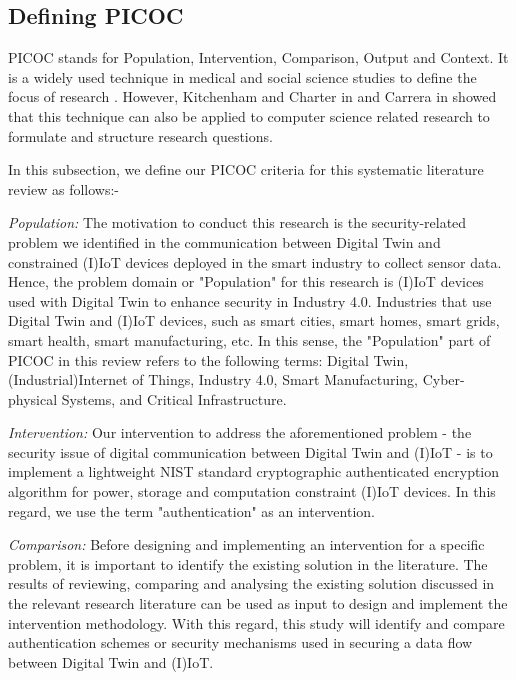 
\subsection{Defining PICOC}
PICOC stands for Population, Intervention, Comparison, Output and Context. It is a widely used technique in medical and social science studies to define the focus of research \cite{carrera-rivera_how-conduct_2022}. However, Kitchenham and Charter in \cite{carrera-rivera_how-conduct_2022} and Carrera in \cite{kitchenham_guidelines_2007} showed that this technique can also be applied to computer science related research to formulate and structure research questions. 

In this subsection, we define our PICOC criteria for this systematic literature review as follows:-

\textit{Population:} The motivation to conduct this research is the security-related problem we identified in the communication between Digital Twin and constrained  (I)IoT devices deployed in the smart industry to collect sensor data. Hence, the problem domain or "Population" for this research is (I)IoT devices used with Digital Twin to enhance security in Industry 4.0. Industries that use Digital Twin and (I)IoT devices, such as smart cities, smart homes, smart grids, smart health, smart manufacturing, etc. In this sense, the "Population" part of PICOC in this review refers to the following terms: Digital Twin, (Industrial)Internet of Things, Industry 4.0, Smart Manufacturing, Cyber-physical Systems, and Critical Infrastructure. 

\textit{Intervention:} Our intervention to address the aforementioned problem - the security issue of digital communication between Digital Twin and (I)IoT - is to implement a lightweight NIST standard cryptographic authenticated encryption algorithm for power, storage and computation constraint (I)IoT devices. In this regard, we use the term "authentication" as an intervention.

\textit{Comparison:} Before designing and implementing an intervention for a specific problem, it is important to identify the existing solution in the literature. The results of reviewing, comparing and analysing the existing solution discussed in the relevant research literature can be used as input to design and implement the intervention methodology. With this regard, this study will identify and compare authentication schemes or security mechanisms used in securing a data flow between Digital Twin and (I)IoT. 

